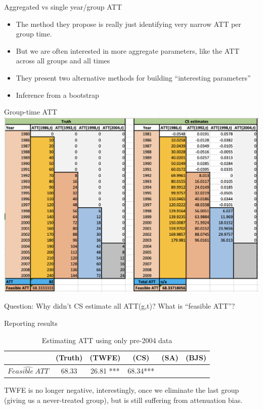 \documentclass{beamer}
\begin{document}
\begin{frame}{Aggregated vs single year/group ATT}

\begin{itemize}
\item The method they propose is really just identifying very narrow ATT per group time.
\item But we are often interested in  more aggregate parameters, like the ATT across all groups and all times
\item They present two alternative methods for building ``interesting parameters'' 
\item Inference from a bootstrap
\end{itemize}


\end{frame}



\begin{frame}{Group-time ATT }
             \includegraphics[scale=0.45]{./lecture_includes/baker_attgt_cs}

Question: Why didn't CS estimate all ATT(g,t)? What is ``feasible ATT''?

\end{frame}

\begin{frame}{Reporting results}
\begin{table}[htbp]\centering
\small
\caption{Estimating ATT using only pre-2004 data}
\begin{center}
\begin{tabular}{l*{5}{c}}
\hline
\multicolumn{1}{l}{\textbf{}}&
\multicolumn{1}{c}{\textbf{(Truth)}}&
\multicolumn{1}{c}{\textbf{(TWFE)}}&
\multicolumn{1}{c}{\textbf{(CS)}}&
\multicolumn{1}{c}{\textbf{(SA)}}&
\multicolumn{1}{c}{\textbf{(BJS)}}\\
\hline
$\widehat{Feasible\ ATT}$  & 68.33    & 26.81 *** & 68.34*** &&\\
\hline
\end{tabular}
\end{center}
\end{table}

TWFE is no longer negative, interestingly, once we eliminate the last group (giving us a never-treated group), but is still suffering from attenuation bias. 

\end{frame}
\end{document}
